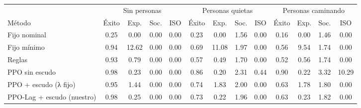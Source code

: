 \begin{tabular}{lcccccccccccc}
\toprule
 & \multicolumn{4}{c}{Sin personas} & \multicolumn{4}{c}{Personas quietas} & \multicolumn{4}{c}{Personas caminando} \\
Método & Éxito & Exp. & Soc. & ISO & Éxito & Exp. & Soc. & ISO & Éxito & Exp. & Soc. & ISO \\
\midrule
Fijo nominal & 0.25 & 0.00 & 0.00 & 0.00 & 0.23 & 0.00 & 1.56 & 0.00 & 0.16 & 0.00 & 1.46 & 0.00 \\
Fijo mínimo & 0.94 & 12.62 & 0.00 & 0.00 & 0.69 & 11.08 & 1.97 & 0.00 & 0.56 & 9.54 & 1.74 & 0.00 \\
Reglas & 0.93 & 0.79 & 0.00 & 0.00 & 0.57 & 0.49 & 1.70 & 0.00 & 0.52 & 0.56 & 1.74 & 0.00 \\
PPO sin escudo & 0.98 & 0.23 & 0.00 & 0.00 & 0.86 & 0.20 & 2.31 & 0.44 & 0.90 & 0.22 & 3.32 & 10.29 \\
PPO + escudo (λ fijo) & 0.95 & 1.44 & 0.00 & 0.00 & 0.74 & 1.83 & 2.00 & 0.00 & 0.63 & 1.78 & 1.80 & 0.00 \\
PPO-Lag + escudo (nuestro) & 0.98 & 0.25 & 0.00 & 0.00 & 0.73 & 0.22 & 1.96 & 0.00 & 0.63 & 0.23 & 1.82 & 0.00 \\
\bottomrule
\end{tabular}
